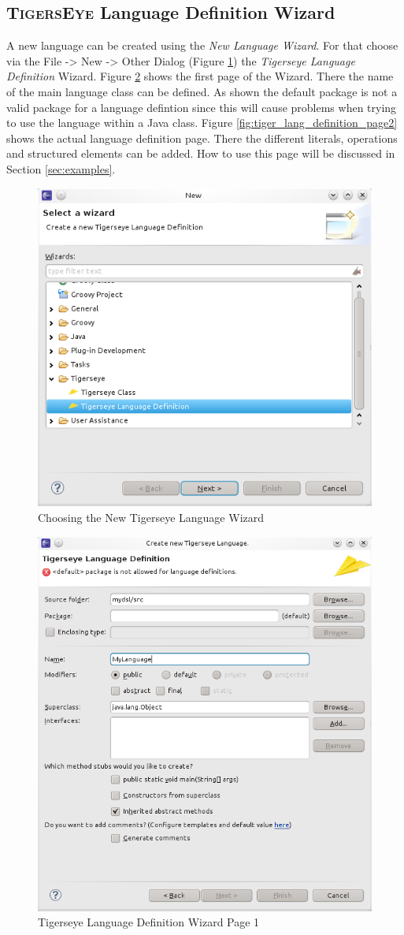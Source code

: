 \documentclass[article,colorback,accentcolor=tud4c]{tudreport}
\newcommand\tiger{%
  \textsc{TigersEye}
}
\begin{document}
	\subsection{\tiger Language Definition Wizard}
	  A new language can be created using the \textit{New Language Wizard}. For that choose via the File -> New -> Other Dialog (Figure \ref{fig:new_tiger_lang}) the \textit{Tigerseye Language Definition} Wizard. Figure \ref{fig:tiger_lang_definition_page1} shows the first page of the Wizard. There the name of the main language class can be defined. As shown the default package is not a valid package for a language defintion since this will cause problems when trying to use the language within a Java class. Figure \ref{fig:tiger_lang_definition_page2} shows the actual language definition page. There the different literals, operations and structured elements can be added. How to use this page will be discussed in Section \ref{sec:examples}.
	
	\begin{figure}
	  \centering
	  \includegraphics[width=.5\textwidth,keepaspectratio=true]{./pics/new_tigesreye_language.png}
	  \caption{Choosing the New Tigerseye Language Wizard}
	  \label{fig:new_tiger_lang}
	\end{figure}

	\begin{figure}
	  \centering
	  \includegraphics[width=.5\textwidth,keepaspectratio=true]{./pics/tigerseye_language_definition_page1.png}
	  \caption{Tigerseye Language Definition Wizard Page 1}
	  \label{fig:tiger_lang_definition_page1}
	\end{figure}
	
\end{document}
